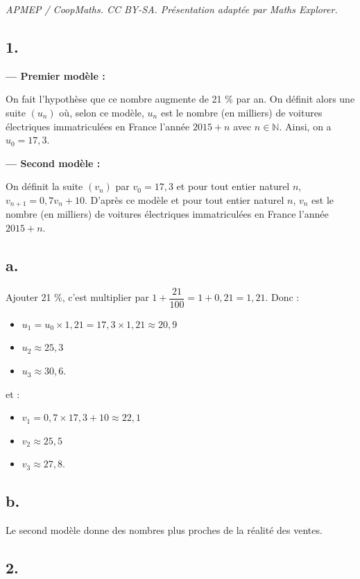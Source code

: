 \documentclass[10pt]{article}
\begin{document}
\noindent\textit{APMEP / CoopMaths. CC BY-SA. Présentation adaptée par Maths Explorer.}\par\medskip
\subsection*{1.}
	
	\noindent
	\textbf{--- Premier modèle :}
	
	On fait l'hypothèse que ce nombre augmente de 21 \% par an. On définit alors une suite \((u_n)\) où, selon ce modèle, \(u_n\) est le nombre (en milliers) de voitures électriques immatriculées en France l'année \(2015+n\) avec \(n \in \mathbb{N}\). Ainsi, on a \(u_0 = 17,3\).
	
	\noindent
	\textbf{--- Second modèle :}
	
	On définit la suite \((v_n)\) par \(v_0 = 17,3\) et pour tout entier naturel \(n\), \(v_{n+1} = 0,7v_n +10\). D'après ce modèle et pour tout entier naturel \(n\), \(v_n\) est le nombre (en milliers) de voitures électriques immatriculées en France l'année \(2015+n\).
	
	\subsection*{a.}
	
	Ajouter 21 \%, c'est multiplier par \(1 + \dfrac{21}{100} = 1 + 0,21 = 1,21\). Donc :
	
	\begin{itemize}
		\item $u_1 = u_0 \times 1,21 = 17,3 \times 1,21 \approx 20,9$
		\item $u_2 \approx 25,3$
		\item $u_3 \approx 30,6$.
	\end{itemize}
	et :
	\begin{itemize}
		\item $v_1 = 0,7 \times 17,3 + 10 \approx 22,1$
		\item $v_2 \approx 25,5$
		\item $v_3 \approx 27,8$.
	\end{itemize}
	
	\subsection*{b.}
	
	Le second modèle donne des nombres plus proches de la réalité des ventes.
	
	\subsection*{2.}
	
\end{document}
